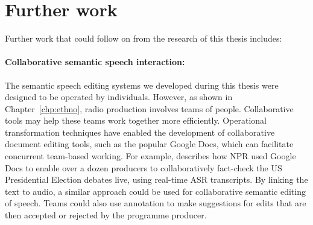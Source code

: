 











\section{Further work}

Further work that could follow on from the research of this thesis includes:

\paragraph{Collaborative semantic speech interaction:}

The semantic speech editing systems we developed during this thesis were designed to be operated by individuals.
However, as shown in Chapter~\ref{chp:ethno}, radio production involves teams of people.  Collaborative tools may help
these teams work together more efficiently.  Operational transformation techniques \citep{Sun2004} have enabled the
development of collaborative document editing tools, such as the popular Google Docs, which can facilitate concurrent
team-based working.  For example, \citet{Fisher2016} describes how NPR used Google Docs to enable over a dozen
producers to collaboratively fact-check the US Presidential Election debates live, using real-time ASR transcripts. By
linking the text to audio, a similar approach could be used for collaborative semantic editing of speech. Teams could
also use annotation to make suggestions for edits that are then accepted or rejected by the programme producer.

